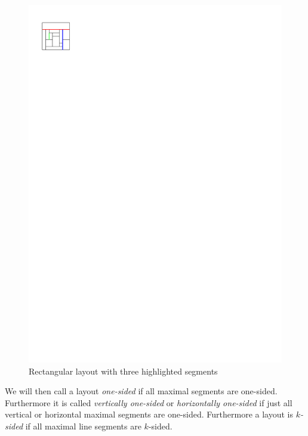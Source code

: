  \begin{figure}[h]
    \centering
    \includegraphics[scale=1]{rectangularDuals/img/segmentdefs}
    \caption{Rectangular layout with three highlighted segments}
    \label{fig:rect:segmentdefs}
  \end{figure}

  We will then call a layout \emph{one-sided} if all maximal segments are one-sided. Furthermore it is called \emph{vertically one-sided} or \emph{horizontally one-sided} if just all vertical or horizontal maximal segments are one-sided. Furthermore a layout is \emph{$k$-sided} if all maximal line segments are $k$-sided.

